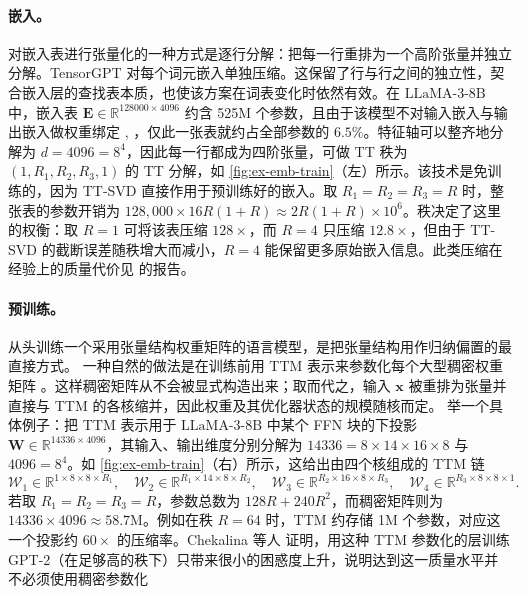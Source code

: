 \documentclass[11pt]{article}
\newcommand{\R}{\mathbb{R}}
\newcommand{\mat}[1]{\mathbf{#1}}
\newcommand{\vecb}[1]{\mathbf{#1}}
\newcommand{\llama}{\text{LLaMA-3-8B}}
\begin{document}
\paragraph{嵌入。} 对嵌入表进行张量化的一种方式是逐行分解：把每一行重排为一个高阶张量并独立分解。TensorGPT \cite{xu2023tensorgpt} 对每个词元嵌入单独压缩。这保留了行与行之间的独立性，契合嵌入层的查找表本质，也使该方案在词表变化时依然有效。在 $\llama$ 中，嵌入表 $\mat{E}\in\R^{128000\times 4096}$ 约含 525M 个参数，且由于该模型不对输入嵌入与输出嵌入做权重绑定 \cite{wolf2017weighttying1}, \cite{inan2017weighttying2}，仅此一张表就约占全部参数的 $6.5\%$。特征轴可以整齐地分解为 $d = 4096 = 8^4$，因此每一行都成为四阶张量，可做 TT 秩为 $(1, R_1, R_2, R_3, 1)$ 的 TT 分解，如 \cref{fig:ex-emb-train}（左）所示。该技术是免训练的，因为 TT-SVD \cite{oseledets2011tensor} 直接作用于预训练好的嵌入。取 $R_1 = R_2 = R_3 = R$ 时，整张表的参数开销为 $128{,}000 \times 16R(1+R) \approx 2R(1+R) \times 10^6$。秩决定了这里的权衡：取 $R=1$ 可将该表压缩 $128{\times}$，而 $R=4$ 只压缩 $12.8{\times}$，但由于 TT-SVD 的截断误差随秩增大而减小，$R=4$ 能保留更多原始嵌入信息。此类压缩在经验上的质量代价见 \cite{xu2023tensorgpt} 的报告。

\paragraph{预训练。}
从头训练一个采用张量结构权重矩阵的语言模型，是把张量结构用作归纳偏置的最直接方式。
一种自然的做法是在训练前用 TTM 表示来参数化每个大型稠密权重矩阵 \cite{chekalina2023ttm}。这样稠密矩阵从不会被显式构造出来；取而代之，输入 $\vecb{x}$ 被重排为张量并直接与 TTM 的各核缩并，因此权重及其优化器状态的规模随核而定。
举一个具体例子：把 TTM 表示用于 $\llama$ 中某个 FFN 块的下投影 $\mat{W}\in\R^{14336\times 4096}$，其输入、输出维度分别分解为 $14336 = 8\times 14\times 16\times 8$ 与 $4096 = 8^4$。如 \cref{fig:ex-emb-train}（右）所示，这给出由四个核组成的 TTM 链
\begin{equation*}
\mathcal{W}_1\in\R^{1\times 8\times 8\times R_1},\quad
\mathcal{W}_2\in\R^{R_1\times 14\times 8\times R_2},\quad
\mathcal{W}_3\in\R^{R_2\times 16\times 8\times R_3},\quad
\mathcal{W}_4\in\R^{R_3\times 8\times 8\times 1}.
\end{equation*}
若取 $R_1 = R_2 = R_3 = R$，参数总数为 $128R + 240R^2$，而稠密矩阵则为 $14336\times 4096\approx 58.7\text{M}$。例如在秩 $R=64$ 时，TTM 约存储 1M 个参数，对应这一个投影约 $60{\times}$ 的压缩率。Chekalina 等人 \cite{chekalina2023ttm} 证明，用这种 TTM 参数化的层训练 GPT-2（在足够高的秩下）只带来很小的困惑度上升，说明达到这一质量水平并不必须使用稠密参数化
\end{document}
